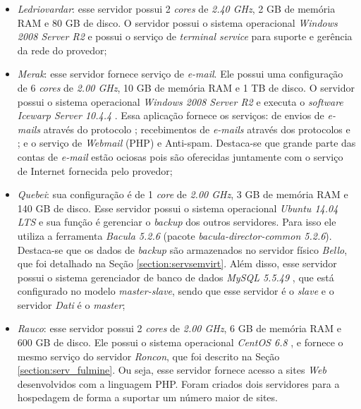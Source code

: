 \begin{itemize}
 \item \textit{Ledriovardar}: esse servidor possui 2 \textit{cores} de \textit{2.40 GHz}, 2 GB de memória \ac{RAM} e 80 GB de disco. 
 O servidor possui o sistema operacional \textit{Windows 2008 Server R2} e possui o serviço de \textit{terminal service} para suporte e gerência 
 da rede do provedor;
 
 \item \textit{Merak}: esse servidor fornece serviço de \textit{e-mail}. Ele possui uma configuração de 6 \textit{cores} de \textit{2.00 GHz}, 
 10 GB de memória \ac{RAM} e 1 TB de disco. O servidor possui o sistema operacional \textit{Windows 2008 Server R2} e executa o \textit{software} 
 \textit{Icewarp Server 10.4.4} \cite{icewarp}. Essa aplicação fornece os serviços: de envios de \textit{e-mails} através do protocolo ; 
 recebimentos de \textit{e-mails} através dos protocolos  e ; e o serviço de \textit{Webmail} (\ac{PHP}) e Anti-spam. 
 Destaca-se que grande parte das contas de \textit{e-mail} estão ociosas pois são oferecidas juntamente com o serviço de Internet fornecida 
 pelo provedor;
 
 \item \textit{Quebei}: sua configuração é de 1 \textit{core} de \textit{2.00 GHz}, 3 GB de memória \ac{RAM} e 140 GB de disco. 
 Esse servidor possui o sistema operacional \textit{Ubuntu 14.04 \ac{LTS}} \cite{ubuntu} e sua função é gerenciar o \textit{backup} dos outros 
 servidores. Para isso ele utiliza a ferramenta \textit{Bacula 5.2.6} \cite{bacula} (pacote \textit{bacula-director-common 5.2.6}). Destaca-se
 que os dados de \textit{backup} são armazenados no servidor físico \textit{Bello}, que foi detalhado na Seção \ref{section:servsemvirt}. 
 Além disso, esse servidor possui o sistema gerenciador de banco de dados \textit{MySQL 5.5.49} \cite{mysql}, que está configurado no modelo 
 \textit{master-slave}, sendo que esse servidor é o \textit{slave} e o servidor \textit{Dati} é o \textit{master};
 
 \item \textit{Rauco}: esse servidor possui 2 \textit{cores} de \textit{2.00 GHz}, 6 GB de memória \ac{RAM} e 600 GB de disco. 
 Ele possui o sistema operacional \textit{CentOS 6.8} \cite{centos}, e fornece o mesmo serviço do servidor \textit{Roncon}, que foi descrito 
 na Seção \ref{section:serv_fulmine}. Ou seja, esse servidor fornece acesso a sites \textit{Web} desenvolvidos com a 
 linguagem \ac{PHP}. Foram criados dois servidores para a hospedagem de forma a suportar um número maior de sites.
\end{itemize}

